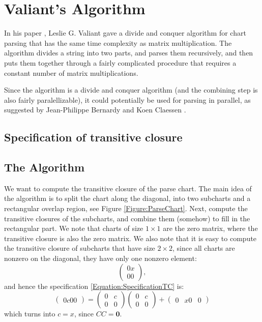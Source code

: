 \newcommand{\zeromat}{\mathbf{0}}
\section{Valiant's Algorithm}
In his paper \cite{Valiant's-Algorithm}, Leslie G. Valiant gave a divide and conquer algorithm for chart parsing that has the same time complexity as matrix multiplication. The algorithm divides a string into two parts, and parses them recursively, and then puts them together through a fairly complicated procedure that requires a constant number of matrix multiplications.

Since the algorithm is a divide and conquer algorithm (and the combining step is also fairly paralellizable), it could potentially be used for parsing in parallel, as suggested by Jean-Philippe Bernardy and Koen Claessen \cite{JP-PP}. 

\subsection{Specification of transitive closure}

\subsection{The Algorithm} 
We want to compute the transitive closure of the parse chart. The main idea of the algorithm is to split the chart along the diagonal, into two subcharts and a rectangular overlap region, see Figure \ref{Figure:ParseChart}. Next, compute the transitive closures of the subcharts, and combine them (somehow) to fill in the rectangular part. We note that charts of size $1 \times 1$ are the zero matrix, where the transitive closure is also the zero matrix. We also note that it is easy to compute the transitive closure of subcharts that have size $2 \times 2$, since all charts are nonzero on the diagonal, they have only one nonzero element:
\begin{equation*}
  \begin{pmatrix}
    0 x \\
    0 0
  \end{pmatrix},
\end{equation*}
and hence the specification \eqref{Equation:SpecificationTC} is: 
\begin{equation*}
  \begin{pmatrix}
    0 c
    0 0
  \end{pmatrix}
  = 
  \begin{pmatrix}
    0 & c\\
    0 & 0 
  \end{pmatrix}
  \begin{pmatrix}
    0 & c \\
    0 & 0
  \end{pmatrix}
  + 
  \begin{pmatrix}
    0 & x
    0 & 0
  \end{pmatrix}
\end{equation*}
which turns into $c = x$, since $CC = \zeromat$.

